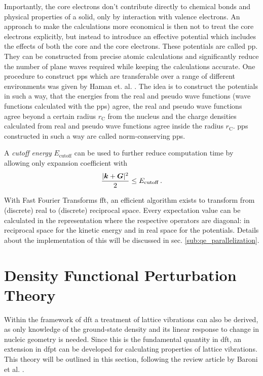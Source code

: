 \documentclass[main.tex]{subfiles}
\begin{document}
Importantly, the core electrons don't contribute directly to chemical bonds and physical properties of a solid, only by interaction with valence electrons.
An approach to make the calculations more economical is then not to treat the core electrons explicitly, but instead to introduce an effective potential which includes the effects of both the core and the core electrons.
These potentials are called \acrfull{pp}.
They can be constructed from precise atomic calculations and significantly reduce the number of plane waves required while keeping the calculations accurate.
One procedure to construct \acrshort{pp}s which are transferable over a range of different environments was given by Haman et. al. \cite{hamann_norm-conserving_1979}.
The idea is to construct the potentials in such a way, that the energies from the real and pseudo wave functions (wave functions calculated with the \acrshort{pp}s) agree, the real and pseudo wave functions agree beyond a certain radius \(r_{\mathrm{C}}\) from the nucleus and the charge densities calculated from real and pseudo wave functions agree inside the radius \(r_{\mathrm{C}}\).
\acrshort{pp}s constructed in such a way are called norm-conserving \acrshort{pp}s.

A \emph{cutoff energy} \(E_{\mathrm{cutoff}}\) can be used to further reduce computation time by allowing only expansion coefficient with 
\begin{equation}
    \frac{\vert \vb*{k} + \vb*{G} \vert^2}{2} \leq E_{\mathrm{cutoff}}\,.
\end{equation}

With Fast Fourier Transforms \gls{fft}, an efficient algorithm exists to transform from (discrete) real to (discrete) reciprocal space.
Every expectation value can be calculated in the representation where the respective operators are diagonal: in reciprocal space for the kinetic energy and in real space for the potentials.
Details about the implementation of this will be discussed in sec. \ref{sub:qe_parallelization}.

\section{Density Functional Perturbation Theory}\label{sec:theory_dfpt}

Within the framework of \acrshort{dft} a treatment of lattice vibrations can also be derived, as only knowledge of the ground-state density and its linear response to change in nucleic geometry is needed.
Since this is the fundamental quantity in \acrshort{dft}, an extension in \acrshort{dfpt} can be developed for calculating properties of lattice vibrations.
This theory will be outlined in this section, following the review article by Baroni et al. \cite{baroni_phonons_2001}.
\end{document}
